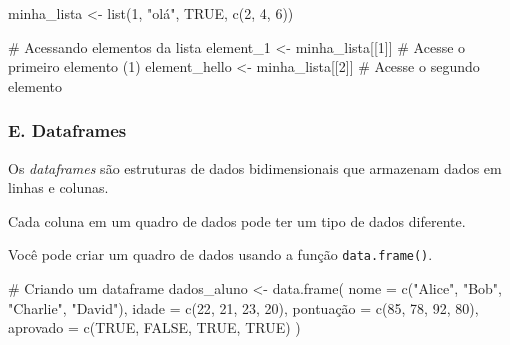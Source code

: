 \documentclass[
  letterpaper,
  DIV=11,
  numbers=noendperiod]{scrartcl}
\newenvironment{Shaded}{\begin{snugshade}}{\end{snugshade}}
\newcommand{\AttributeTok}[1]{\textcolor[rgb]{0.40,0.45,0.13}{#1}}
\newcommand{\CommentTok}[1]{\textcolor[rgb]{0.37,0.37,0.37}{#1}}
\newcommand{\ConstantTok}[1]{\textcolor[rgb]{0.56,0.35,0.01}{#1}}
\newcommand{\DecValTok}[1]{\textcolor[rgb]{0.68,0.00,0.00}{#1}}
\newcommand{\FunctionTok}[1]{\textcolor[rgb]{0.28,0.35,0.67}{#1}}
\newcommand{\NormalTok}[1]{\textcolor[rgb]{0.00,0.23,0.31}{#1}}
\newcommand{\OtherTok}[1]{\textcolor[rgb]{0.00,0.23,0.31}{#1}}
\newcommand{\StringTok}[1]{\textcolor[rgb]{0.13,0.47,0.30}{#1}}
\begin{document}
\begin{Shaded}
\begin{Highlighting}[]
\NormalTok{minha\_lista }\OtherTok{\textless{}{-}} \FunctionTok{list}\NormalTok{(}\DecValTok{1}\NormalTok{, }\StringTok{"olá"}\NormalTok{, }\ConstantTok{TRUE}\NormalTok{, }\FunctionTok{c}\NormalTok{(}\DecValTok{2}\NormalTok{, }\DecValTok{4}\NormalTok{, }\DecValTok{6}\NormalTok{))}

\CommentTok{\# Acessando elementos da lista}
\NormalTok{element\_1 }\OtherTok{\textless{}{-}}\NormalTok{ minha\_lista[[}\DecValTok{1}\NormalTok{]] }\CommentTok{\# Acesse o primeiro elemento (1)}
\NormalTok{element\_hello }\OtherTok{\textless{}{-}}\NormalTok{ minha\_lista[[}\DecValTok{2}\NormalTok{]] }\CommentTok{\# Acesse o segundo elemento}
\end{Highlighting}
\end{Shaded}

\hypertarget{e.-dataframes}{%
\subsubsection{E. Dataframes}\label{e.-dataframes}}

Os \emph{dataframes} são estruturas de dados bidimensionais que
armazenam dados em linhas e colunas.

Cada coluna em um quadro de dados pode ter um tipo de dados diferente.

Você pode criar um quadro de dados usando a função
\texttt{data.frame()}.

\begin{Shaded}
\begin{Highlighting}[]
\CommentTok{\# Criando um dataframe}
\NormalTok{dados\_aluno }\OtherTok{\textless{}{-}} \FunctionTok{data.frame}\NormalTok{(}
     \AttributeTok{nome =} \FunctionTok{c}\NormalTok{(}\StringTok{"Alice"}\NormalTok{, }\StringTok{"Bob"}\NormalTok{, }\StringTok{"Charlie"}\NormalTok{, }\StringTok{"David"}\NormalTok{),}
     \AttributeTok{idade =} \FunctionTok{c}\NormalTok{(}\DecValTok{22}\NormalTok{, }\DecValTok{21}\NormalTok{, }\DecValTok{23}\NormalTok{, }\DecValTok{20}\NormalTok{),}
\NormalTok{     pontuação }\OtherTok{=} \FunctionTok{c}\NormalTok{(}\DecValTok{85}\NormalTok{, }\DecValTok{78}\NormalTok{, }\DecValTok{92}\NormalTok{, }\DecValTok{80}\NormalTok{),}
     \AttributeTok{aprovado =} \FunctionTok{c}\NormalTok{(}\ConstantTok{TRUE}\NormalTok{, }\ConstantTok{FALSE}\NormalTok{, }\ConstantTok{TRUE}\NormalTok{, }\ConstantTok{TRUE}\NormalTok{)}
\NormalTok{)}
\end{Highlighting}
\end{Shaded}
\end{document}
